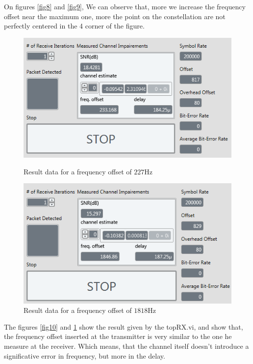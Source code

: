 \documentclass[frenchb, oneside, headings=normal]{scrartcl}
\begin{document}
On figures \ref{fig8} and \ref{fig9}, We can observe that, more we increase the frequency offset near the maximum one, more the point on the constellation are not perfectly centered in the 4 corner of the figure.

\begin{figure}[!ht]
    \begin{minipage}[b]{0.48\linewidth}
        \centering \includegraphics[scale=0.7]{img/USRP_value_227.PNG}
     \caption{Result data for a frequency offset of $227 \si{\hertz}$}
     \label{fig10}
    \end{minipage}\hfill
    \begin{minipage}[b]{0.48\linewidth}
         \centering \includegraphics[scale=0.7]{img/USRP_value_1818.PNG}
          \caption{Result data for a frequency offset of $1818 \si{\hertz}$}
          \label{fig11}
    \end{minipage}  
\end{figure}

The figures \ref{fig10} and \ref{fig11} show the result given by the topRX.vi, and show that, the frequency offset inserted at the transmitter is very similar to the one he measure at the receiver. Which means, that the channel itself doesn't introduce a significative error in frequency, but more in the delay.
\end{document}
